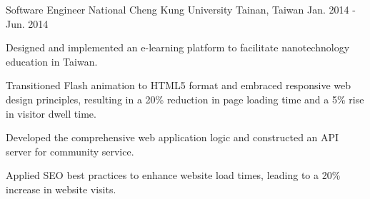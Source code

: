 \begin{cventries}
  \cventry
    {Software Engineer} %
    {National Cheng Kung University} %
    {Tainan, Taiwan} %
    {Jan. 2014 - Jun. 2014} %
    {
      \begin{cvitems} %
        \item {Designed and implemented an e-learning platform to facilitate nanotechnology education in Taiwan.}
        \item {Transitioned Flash animation to HTML5 format and embraced responsive web design principles, resulting in a 20\% reduction in page loading time and a 5\% rise in visitor dwell time.}
        \item {Developed the comprehensive web application logic and constructed an API server for community service.}
        \item {Applied SEO best practices to enhance website load times, leading to a 20\% increase in website visits.}
      \end{cvitems}
    }

\end{cventries}
